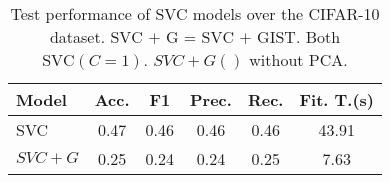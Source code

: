 \begin{table}
    \centering
    \caption{Test performance of SVC models over the CIFAR-10 dataset. $\text{SVC + G = SVC + GIST}$. Both $\text{SVC}(C=1)$. $SVC + G()$ without PCA.}
    \label{tab:test_svc_performance}
    \begin{tabular}{|l|c|c|c|c|c|}
    \toprule
    Model & Acc. & F1 & Prec. & Rec. & Fit. T.(s)\\
    \midrule
    SVC & 0.47 & 0.46 & 0.46 & 0.46 & 43.91\\
    $SVC + G$  & 0.25 & 0.24 & 0.24 & 0.25 & 7.63 \\
    \bottomrule
    \end{tabular}
\end{table}